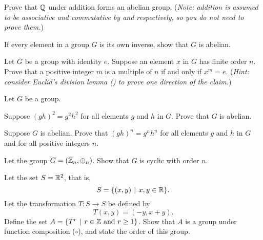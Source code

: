 \begin{problem}\label{problem-Q-is-abelian-group-under-addition}
    Prove that $\mathbb{Q}$ under addition forms an abelian group.\newline
    (\textit{Note: addition is assumed to be associative and commutative by  and  respectively, so you do not need to prove them.})
\end{problem}

\begin{problem}
    If every element in a group $G$ is its own inverse, show that $G$ is abelian.
\end{problem}

\begin{problem}\label{problem-element-to-power-of-multiple-of-order-is-identity}
    Let $G$ be a group with identity $e$. Suppose an element $x$ in $G$ has finite order $n$. Prove that a positive integer $m$ is a multiple of $n$ if and only if $x^m = e$.\newline
    (\textit{Hint: consider Euclid's division lemma () to prove one direction of the claim.})
\end{problem}

\begin{problem}
    Let $G$ be a group.
    \begin{partquestions}{\alph*}
        \item Suppose $(gh)^2 = g^2h^2$ for all elements $g$ and $h$ in $G$. Prove that $G$ is abelian.
        \item Suppose $G$ is abelian. Prove that $(gh)^n = g^nh^n$ for all elements $g$ and $h$ in $G$ and for all positive integers $n$.
    \end{partquestions}
\end{problem}

\begin{problem}
    Let the group $G = (\mathbb{Z}_n, \oplus_n)$. Show that $G$ is cyclic with order $n$.
\end{problem}

\begin{problem}
    Let the set $S = \mathbb{R}^2$, that is,
    \[
        S = \{(x, y) \vert x, y \in \R\}.
    \]
    Let the transformation $T: S \to S$ be defined by
    \[
        T(x, y) = (-y, x+y).
    \]
    Define the set $A = \{T^r \vert r \in \Z \text{ and } r \geq 1\}$. Show that $A$ is a group under function composition ($\circ$), and state the order of this group.
\end{problem}
